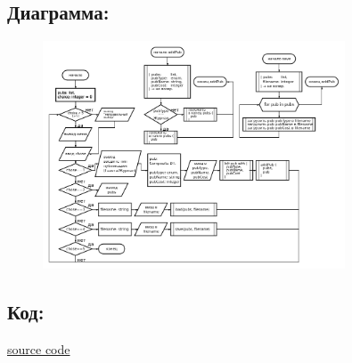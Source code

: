 \documentclass[14pt,a4paper]{article}
\begin{document}
\subsection{Диаграмма:}
\begin{figure}[h]
    \centering
    \includegraphics[width=0.8\textwidth]{data/diagram16_2.png}
\end{figure}
\subsection{Код:}

\href{https://raw.githubusercontent.com/John1400800/stuff/refs/heads/main/c_learning/home_works/task16_2.cpp}{source code}
\newpage
\end{document}
